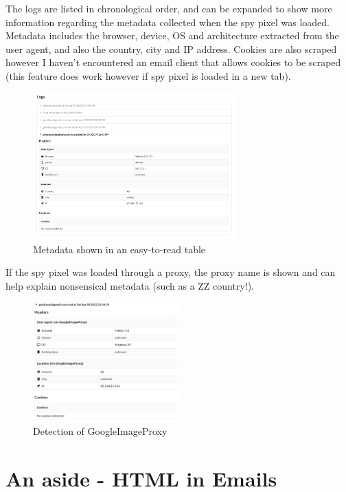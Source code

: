 \documentclass{article}
\begin{document}
The logs are listed in chronological order, and can be expanded to show more information regarding the metadata collected when the spy pixel was loaded. Metadata includes the browser, device, OS and architecture extracted from the user agent, and also the country, city and IP address. Cookies are also scraped however I haven't encountered an email client that allows cookies to be scraped (this feature does work however if spy pixel is loaded in a new tab).

\begin{figure}[H]
\centering
\includegraphics[width=0.7\textwidth]{images/logs.png}
\caption{Metadata shown in an easy-to-read table}
\end{figure}

If the spy pixel was loaded through a proxy, the proxy name is shown and can help explain nonsensical metadata (such as a ZZ country!).

\begin{figure}[H]
\centering
\includegraphics[width=0.5\textwidth]{images/gmailproxy.png}
\caption{Detection of GoogleImageProxy}
\end{figure}

\section{An aside - HTML in Emails}
\end{document}
